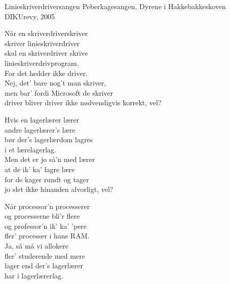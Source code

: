 \begin{song}{Linieskriverdriversangen}
  {} %
  {Peberkagesangen, Dyrene i Hakkebakkeskoven} %
  {} %
  {DIKUrevy, 2005} %
  {\NotCCLIed} %

  \begin{SBVerse}
    Når en skriverdriverskriver\\
    skriver linieskriverdriver\\
    skal en skriverdriver skrive\\
    linieskriverdrivprogram.\\\medskip
    For det hedder ikke driver.\\
    Nej, det' bare nog't man skriver,\\
    men bar' fordi Microsoft de skriver\\
    driver bliver driver ikke nødvendigvis korrekt, vel?
  \end{SBVerse}

  \begin{SBVerse}
    Hvis en lagerlærer lærer\\
    andre lagerlærer's lære\\
    bør der's lagerlærdom lagres\\
    i et lærelagerlag.\\\medskip
    Men det er jo så'n med lærer\\
    at de ik' ka' lagre lære\\
    for de kager rundt og tager\\
    jo slet ikke hinanden alvorligt, vel?
  \end{SBVerse}

  \begin{SBVerse}
    Når processor'n processerer\\
    og processerne bli'r flere\\
    og professor'n ik' ka' 'pere\\
    fler' processer i hans RAM.\\\medskip
    Ja, så må vi allokere\\
    fler' studerende med mere\\
    lager end der's lagerlærer\\
    har i lagerlærerlag.
  \end{SBVerse}


\end{song}
